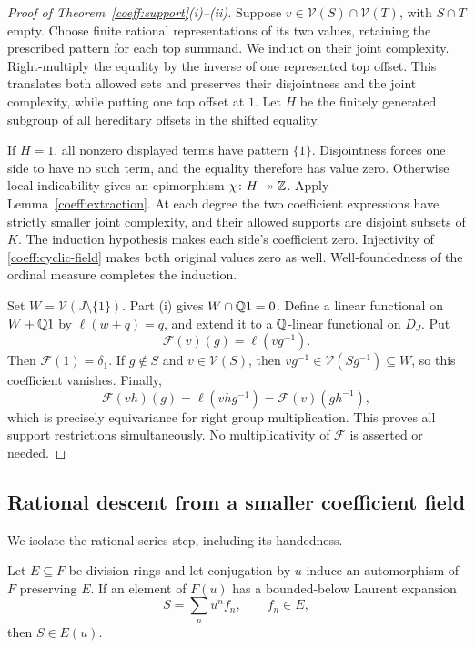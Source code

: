 \begin{proof}[Proof of Theorem~\ref{coeff:support}(i)--(ii)]
Suppose \(v\in\mathcal V(S)\cap\mathcal V(T)\), with \(S\cap T\)
empty. Choose finite rational representations of its two values,
retaining the prescribed pattern for each top summand. We induct on
their joint complexity. Right-multiply the equality by the inverse of
one represented top offset. This translates both allowed sets and
preserves their disjointness and the joint complexity, while putting
one top offset at \(1\). Let \(H\) be the finitely generated subgroup
of all hereditary offsets in the shifted equality.

If \(H=1\), all nonzero displayed terms have pattern \(\{1\}\).
Disjointness forces one side to have no such term, and the equality
therefore has value zero. Otherwise local indicability gives an
epimorphism \(\chi\colon H\twoheadrightarrow\mathbb Z\). Apply
Lemma~\ref{coeff:extraction}. At each degree the two coefficient
expressions have strictly smaller joint complexity, and their allowed
supports are disjoint subsets of \(K\). The induction hypothesis
makes each side's coefficient zero. Injectivity of
\eqref{coeff:cyclic-field} makes both original values zero as well.
Well-foundedness of the ordinal measure completes the induction.

Set \(W=\mathcal V(J\setminus\{1\})\). Part (i) gives
\(W\cap\mathbb Q1=0\). Define a linear functional on \(W+\mathbb Q1\) by
\(\ell(w+q)=q\), and extend it to a \(\mathbb Q\)-linear functional on
\(D_J\). Put
\begin{equation}\label{coeff:scalar-map}
 \mathcal F(v)(g)=\ell(vg^{-1}).
\end{equation}
Then \(\mathcal F(1)=\delta_1\). If \(g\notin S\) and
\(v\in\mathcal V(S)\), then
\(vg^{-1}\in\mathcal V(Sg^{-1})\subseteq W\), so this coefficient
vanishes. Finally,
\[
 \mathcal F(vh)(g)=\ell(vhg^{-1})
   =\mathcal F(v)(gh^{-1}),
\]
which is precisely equivariance for right group multiplication.
This proves all support restrictions simultaneously. No multiplicativity
of \(\mathcal F\) is asserted or needed.
\end{proof}

\subsection{Rational descent from a smaller coefficient field}

We isolate the rational-series step, including its handedness.

\begin{lemma}\label{coeff:rational-descent}
Let \(E\subseteq F\) be division rings and let conjugation by \(u\)
induce an automorphism of \(F\) preserving \(E\). If an element of
\(F(u)\) has a bounded-below Laurent expansion
\[
 S=\sum_n u^n f_n,\qquad f_n\in E,
\]
then \(S\in E(u)\).
\end{lemma}

